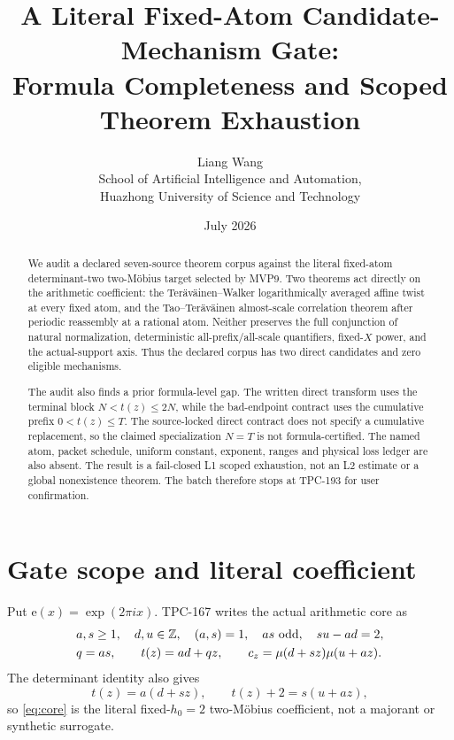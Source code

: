 \documentclass[11pt]{article}
\title{\textbf{A Literal Fixed-Atom Candidate-Mechanism Gate:}\\
\textbf{Formula Completeness and Scoped Theorem Exhaustion}}
\author{Liang Wang\\
School of Artificial Intelligence and Automation,\\
Huazhong University of Science and Technology}
\date{July 2026}
\newcommand{\e}{\mathrm e}
\begin{document}
\maketitle

\begin{abstract}
We audit a declared seven-source theorem corpus against the literal
fixed-atom determinant-two two-M\"obius target selected by MVP9.  Two
theorems act directly on the arithmetic coefficient: the
Ter\"av\"ainen--Walker logarithmically averaged affine twist at every fixed
atom, and the Tao--Ter\"av\"ainen almost-scale correlation theorem after
periodic reassembly at a rational atom.  Neither preserves the full
conjunction of natural normalization, deterministic all-prefix/all-scale
quantifiers, fixed-\(X\) power, and the actual-support axis.  Thus the
declared corpus has two direct candidates and zero eligible mechanisms.

The audit also finds a prior formula-level gap.  The written direct
transform uses the terminal block \(N<t(z)\le2N\), while the bad-endpoint
contract uses the cumulative prefix \(0<t(z)\le T\).  The source-locked
direct contract does not specify a cumulative replacement, so the claimed
specialization \(N=T\) is not formula-certified.  The named atom, packet
schedule, uniform constant, exponent, ranges and physical loss ledger are
also absent.  The result is a fail-closed L1 scoped exhaustion, not an L2
estimate or a global nonexistence theorem.  The batch therefore stops at
TPC-193 for user confirmation.
\end{abstract}

\section{Gate scope and literal coefficient}

Put \(\e(x)=\exp(2\pi i x)\).  TPC-167 writes the actual arithmetic core as
\citep{WangTPC167}
\begin{align}
 &a,s\ge1,\quad d,u\in\mathbb Z,\quad (a,s)=1,\quad
 as\ {\rm odd},\quad su-ad=2,                                      \label{eq:data}\\
 &q=as,\qquad t(z)=ad+qz,\qquad
 c_z=\mu(d+sz)\mu(u+az).                                           \label{eq:core}
\end{align}
The determinant identity also gives
\[
 t(z)=a(d+sz),\qquad t(z)+2=s(u+az),
\]
so \eqref{eq:core} is the literal fixed-\(h_0=2\) two-M\"obius
coefficient, not a majorant or synthetic surrogate.
\end{document}
